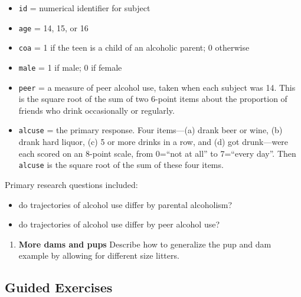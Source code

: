 \documentclass[
]{krantz}
\providecommand{\tightlist}{%
  \setlength{\itemsep}{0pt}\setlength{\parskip}{0pt}}
\begin{document}
\begin{enumerate}
  \begin{itemize}
  \tightlist
  \item
    \texttt{id} = numerical identifier for subject
  \item
    \texttt{age} = 14, 15, or 16
  \item
    \texttt{coa} = 1 if the teen is a child of an alcoholic parent; 0 otherwise
  \item
    \texttt{male} = 1 if male; 0 if female
  \item
    \texttt{peer} = a measure of peer alcohol use, taken when each subject was 14. This is the square root of the sum of two 6-point items about the proportion of friends who drink occasionally or regularly.
  \item
    \texttt{alcuse} = the primary response. Four items---(a) drank beer or wine, (b) drank hard liquor, (c) 5 or more drinks in a row, and (d) got drunk---were each scored on an 8-point scale, from 0=``not at all'' to 7=``every day''. Then \texttt{alcuse} is the square root of the sum of these four items.
  \end{itemize}

  Primary research questions included:

  \begin{itemize}
  \tightlist
  \item
    do trajectories of alcohol use differ by parental alcoholism?
  \item
    do trajectories of alcohol use differ by peer alcohol use?
  \end{itemize}
\end{enumerate}

\begin{enumerate}
\def\labelenumi{\arabic{enumi}.}
\setcounter{enumi}{1}
\tightlist
\item
  \textbf{More dams and pups} Describe how to generalize the pup and dam example by allowing for different size litters.
\end{enumerate}

\subsection{Guided Exercises}\label{guided-exercises-5}
\end{document}
